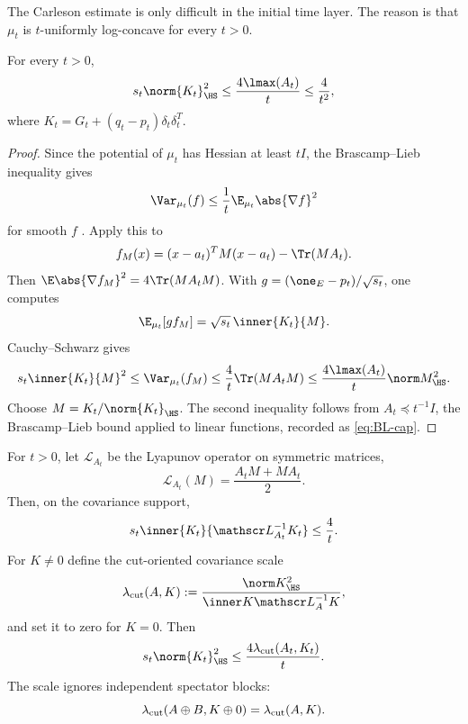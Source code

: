 \documentclass[../../main.tex]{subfiles}
\begin{document}
The Carleson estimate is only difficult in the initial time layer. The reason is that $\mu_t$ is
$t$-uniformly log-concave for every $t>0$.

\begin{lemma}
\label{lem:pathwise-BL}
For every $t>0$,
\begin{equation}\label{eq:BL-source}
  s_t\norm{K_t}_{\HS}^2
  \le \frac{4\lmax(A_t)}{t}
  \le \frac4{t^2},
\end{equation}
where $K_t=G_t+(q_t-p_t)\delta_t\delta_t^T$.
\end{lemma}

\begin{proof}
Since the potential of $\mu_t$ has Hessian at least $tI$, the Brascamp--Lieb inequality gives
\[
  \Var_{\mu_t}(f)\le\frac1t\E_{\mu_t}\abs{\nabla f}^2
\]
for smooth $f$ \cite{BrascampLieb1976}. Apply this to
\[
  f_M(x)=(x-a_t)^TM(x-a_t)-\Tr(MA_t).
\]
Then $\E\abs{\nabla f_M}^2=4\Tr(MA_tM)$. With
$g=(\one_E-p_t)/\sqrt{s_t}$, one computes
\[
  \E_{\mu_t}[g f_M]=\sqrt{s_t}\,\inner{K_t}{M}.
\]
Cauchy--Schwarz gives
\[
  s_t\inner{K_t}{M}^2
  \le \Var_{\mu_t}(f_M)
  \le\frac4t\Tr(MA_tM)
  \le\frac{4\lmax(A_t)}t\norm M_{\HS}^2 .
\]
Choose $M=K_t/\norm{K_t}_{\HS}$. The second inequality follows from $A_t\preceq t^{-1}I$, the
Brascamp--Lieb bound applied to linear functions, recorded as \eqref{eq:BL-cap}.
\end{proof}

\begin{lemma}
\label{lem:lyapunov-stein-duality}
For $t>0$, let $\mathscr L_{A_t}$ be the Lyapunov operator on symmetric matrices,
\[
  \mathscr L_{A_t}(M)=\frac{A_tM+MA_t}{2}.
\]
Then, on the covariance support,
\begin{equation}\label{eq:lyapunov-stein-duality}
  s_t\inner{K_t}{\mathscr L_{A_t}^{-1}K_t}\le\frac4t.
\end{equation}
For $K\ne0$ define the cut-oriented covariance scale
\[
  \lambda_{\rm cut}(A,K)
  :=\frac{\norm K_{\HS}^2}{\inner K{\mathscr L_A^{-1}K}},
\]
and set it to zero for $K=0$. Then
\begin{equation}\label{eq:cut-oriented-source-scale}
  s_t\norm{K_t}_{\HS}^2
  \le\frac{4\lambda_{\rm cut}(A_t,K_t)}t.
\end{equation}
The scale ignores independent spectator blocks:
\[
  \lambda_{\rm cut}(A\oplus B,K\oplus0)=\lambda_{\rm cut}(A,K).
\]
\end{lemma}
\end{document}
